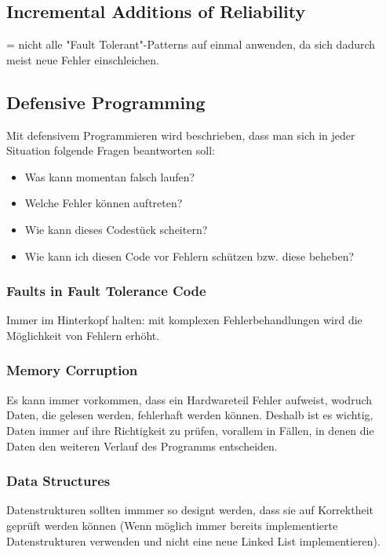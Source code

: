 \subsection{Incremental Additions of Reliability}

= nicht alle "Fault Tolerant"-Patterns auf einmal anwenden, da sich dadurch meist neue Fehler einschleichen.

\subsection{Defensive Programming}

Mit defensivem Programmieren wird beschrieben, dass man sich in jeder Situation folgende Fragen beantworten soll:
\begin{itemize}
	\item Was kann momentan falsch laufen?
    \item Welche Fehler können auftreten?
    \item Wie kann dieses Codestück scheitern?
    \item Wie kann ich diesen Code vor Fehlern schützen bzw. diese beheben?
\end{itemize}

\subsubsection*{Faults in Fault Tolerance Code}

Immer im Hinterkopf halten: mit komplexen Fehlerbehandlungen wird die Möglichkeit von Fehlern erhöht.

\subsubsection*{Memory Corruption}

Es kann immer vorkommen, dass ein Hardwareteil Fehler aufweist, wodruch Daten, die gelesen werden, fehlerhaft werden können. Deshalb ist es wichtig, Daten immer auf ihre Richtigkeit zu prüfen, vorallem in Fällen, in denen die Daten den weiteren Verlauf des Programms entscheiden.

\subsubsection*{Data Structures}

Datenstrukturen sollten immmer so designt werden, dass sie auf Korrektheit geprüft werden können (Wenn möglich immer bereits implementierte Datenstrukturen verwenden und nicht eine neue Linked List implementieren).

